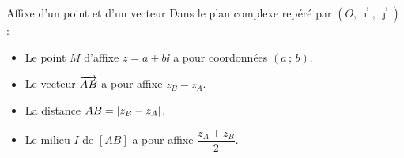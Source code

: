 %
%

\begin{propriete}{Affixe d'un point et d'un vecteur}{}
	Dans le plan complexe repéré par $(O, \vec{\imath}, \vec{\jmath})$ :
	\begin{itemize}[label=\textbullet]
		\item Le point $M$ d'affixe $z = a + b\ii$ a pour coordonnées $(a\,;\,b)$.
		\item Le vecteur $\overrightarrow{AB}$ a pour affixe $z_B - z_A$.
		\item La distance $AB = \left|z_B - z_A\right|$.
		\item Le milieu $I$ de $[AB]$ a pour affixe $\dfrac{z_A + z_B}{2}$.
	\end{itemize}
\end{propriete}


